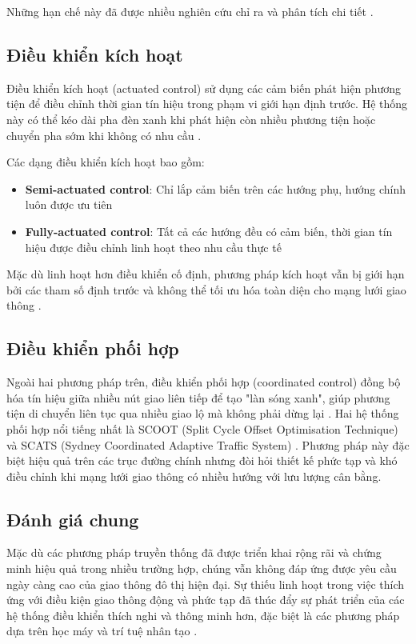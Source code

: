 Những hạn chế này đã được nhiều nghiên cứu chỉ ra và phân tích chi tiết \cite{Zhao2012, Shaikh2022}.

\subsection{Điều khiển kích hoạt}

Điều khiển kích hoạt (actuated control) sử dụng các cảm biến phát hiện phương tiện để điều chỉnh thời gian tín hiệu trong phạm vi giới hạn định trước. Hệ thống này có thể kéo dài pha đèn xanh khi phát hiện còn nhiều phương tiện hoặc chuyển pha sớm khi không có nhu cầu \cite{Koonce2008, Eom2020}.

Các dạng điều khiển kích hoạt bao gồm:
\begin{itemize}
    \item \textbf{Semi-actuated control}: Chỉ lắp cảm biến trên các hướng phụ, hướng chính luôn được ưu tiên
    \item \textbf{Fully-actuated control}: Tất cả các hướng đều có cảm biến, thời gian tín hiệu được điều chỉnh linh hoạt theo nhu cầu thực tế
\end{itemize}

Mặc dù linh hoạt hơn điều khiển cố định, phương pháp kích hoạt vẫn bị giới hạn bởi các tham số định trước và không thể tối ưu hóa toàn diện cho mạng lưới giao thông \cite{Mirchandani2001}.

\subsection{Điều khiển phối hợp}

Ngoài hai phương pháp trên, điều khiển phối hợp (coordinated control) đồng bộ hóa tín hiệu giữa nhiều nút giao liên tiếp để tạo "làn sóng xanh", giúp phương tiện di chuyển liên tục qua nhiều giao lộ mà không phải dừng lại \cite{Hunt1981, Lowrie1990}. Hai hệ thống phối hợp nổi tiếng nhất là SCOOT (Split Cycle Offset Optimisation Technique) \cite{Hunt1981} và SCATS (Sydney Coordinated Adaptive Traffic System) \cite{Lowrie1990}. Phương pháp này đặc biệt hiệu quả trên các trục đường chính nhưng đòi hỏi thiết kế phức tạp và khó điều chỉnh khi mạng lưới giao thông có nhiều hướng với lưu lượng cân bằng.

\subsection{Đánh giá chung}

Mặc dù các phương pháp truyền thống đã được triển khai rộng rãi và chứng minh hiệu quả trong nhiều trường hợp, chúng vẫn không đáp ứng được yêu cầu ngày càng cao của giao thông đô thị hiện đại. Sự thiếu linh hoạt trong việc thích ứng với điều kiện giao thông động và phức tạp đã thúc đẩy sự phát triển của các hệ thống điều khiển thích nghi và thông minh hơn, đặc biệt là các phương pháp dựa trên học máy và trí tuệ nhân tạo \cite{Abdulhai2003, Li2016, Shaikh2022}.

